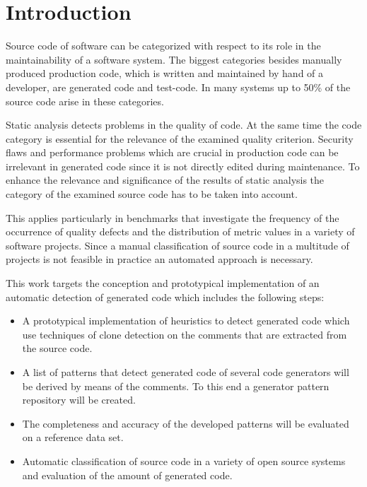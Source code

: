 
\chapter{Introduction}\label{chapter:introduction}

Source code of software can be categorized with respect to its role in the maintainability of a software system. The biggest categories besides manually produced production code, which is written and maintained by hand of a developer, are generated code and test-code. In many systems up to 50\% of the source code arise in these categories.

Static analysis detects problems in the quality of code. At the same time the code category is essential for the relevance of the examined quality criterion. Security flaws and performance problems which are crucial in production code can be irrelevant in generated code since it is not directly edited during maintenance. To enhance the relevance and significance of the results of static analysis the category of the examined source code has to be taken into account.

This applies particularly in benchmarks that investigate the frequency of the occurrence of quality defects and the distribution of metric values in a variety of software projects. Since a manual classification of source code in a multitude of projects is not feasible in practice an automated approach is necessary.

This work targets the conception and prototypical implementation of an automatic detection of generated code which includes the following steps:

\begin{itemize}
	\item A prototypical implementation of heuristics to detect generated code which use techniques of clone detection on the comments that are extracted from the source code.
	\item A list of patterns that detect generated code of several code generators will be derived by means of the comments. To this end a generator pattern repository will be created.
	\item The completeness and accuracy of the developed patterns will be evaluated on a reference data set. 
	\item Automatic classification of source code in a variety of open source systems and evaluation of the amount of generated code. 
\end{itemize}